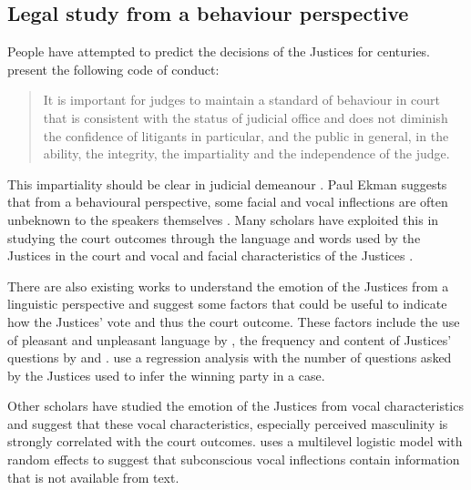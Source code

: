 \documentclass{monashthesis}
\begin{document}
\hypertarget{legal-study-from-a-behaviour-perspective}{%
\subsection{Legal study from a behaviour perspective}\label{legal-study-from-a-behaviour-perspective}}

People have attempted to predict the decisions of the Justices for centuries. \textcite{judicalguid} present the following code of conduct:

\begin{quote}
It is important for judges to maintain a standard of behaviour in court that is consistent with the status of judicial office and does not diminish the confidence of litigants in particular, and the public in general, in the ability, the integrity, the impartiality and the independence of the judge.
\end{quote}

This impartiality should be clear in judicial demeanour \autocite{tutton2018judicial,goffman1956nature}. Paul Ekman \autocite{ekman1991invited} suggests that from a behavioural perspective, some facial and vocal inflections are often unbeknown to the speakers themselves . Many scholars have exploited this in studying the court outcomes through the language and words used by the Justices in the court \autocite{Shullman2004illusion} and vocal and facial characteristics of the Justices \autocite{chen2018justice}.

There are also existing works to understand the emotion of the Justices from a linguistic perspective and suggest some factors that could be useful to indicate how the Justices' vote and thus the court outcome. These factors include the use of pleasant and unpleasant language by \textcite{black2011emotions}, the frequency and content of Justices' questions by \textcite{Shullman2004illusion} and \textcite{johnson2009inquiring}. \textcite{epstein2010inferring} use a regression analysis with the number of questions asked by the Justices used to infer the winning party in a case.

Other scholars \autocite{chen2016perceived,chen2017covering,schubert1992observing} have studied the emotion of the Justices from vocal characteristics and suggest that these vocal characteristics, especially perceived masculinity is strongly correlated with the court outcomes. \textcite{dietrich2019emotional} uses a multilevel logistic model with random effects to suggest that subconscious vocal inflections contain information that is not available from text.
\end{document}
